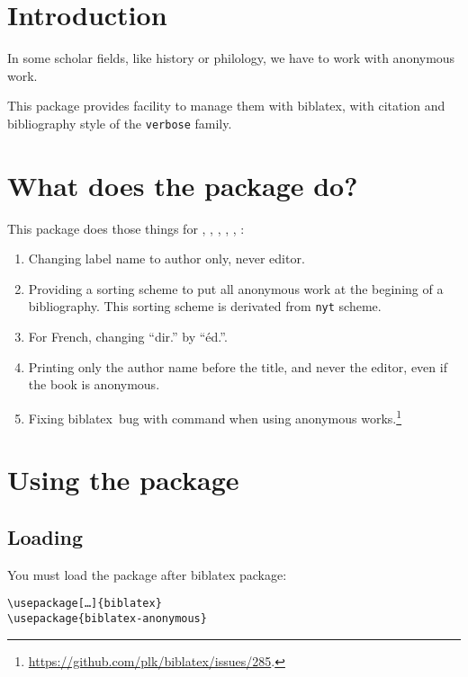 \documentclass{ltxdockit}[2011/03/25]
\newcommand{\biblatex}{biblatex\xspace}
\newcommand{\namebibstyle}[1]{\texttt{#1}}
\begin{document}
\printtitlepage
\tableofcontents

\section{Introduction}

In some scholar fields, like history or philology, we have to work with anonymous work. 

This package provides facility to manage them with \biblatex, with citation and bibliography style of the \namebibstyle{verbose} family.

\section{What does the package do?}

This package does those things for  , , , , , :
\begin{enumerate}
	

	\item Changing label name to author only, never editor.
	\item Providing a sorting scheme to put all anonymous work at the begining of a bibliography. This sorting scheme is derivated from \verb+nyt+ scheme.
	\item For French, changing \enquote{dir.} by \enquote{éd.}.
	\item Printing only the author name  before the title, and never the editor, even if the book is anonymous.
 	\item Fixing \biblatex\ bug with  \expandafter\cs\expandafter{\prm{xx}cites} command when using anonymous works.\footnote{\url{https://github.com/plk/biblatex/issues/285}.}
		
\end{enumerate}

\section{Using the package}

\subsection{Loading}
You must load the package after \biblatex package:
\begin{verbatim}
\usepackage[…]{biblatex}
\usepackage{biblatex-anonymous}
\end{verbatim}
\end{document}
